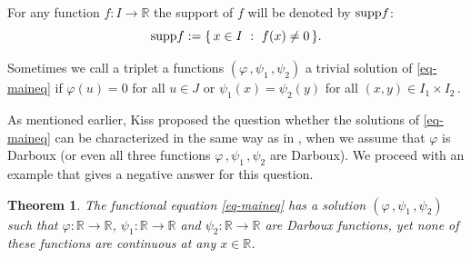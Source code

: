 \documentclass[12pt]{amsart}
\newtheorem{thm}{Theorem}
\theoremstyle{remark}
\theoremstyle{definition}
\newcommand{\RR}{\mathbb{R}}
\newcommand{\supp}{\mbox{\rm supp}}
\newcommand{\map}{\longrightarrow}
\begin{document}
For any function 
$ f : I \map \RR $ the support of $ f $ 
will be denoted by $ \supp f $: 
\[
\supp f := 
\lbrace \, x \in I \ : \ f(x) \neq 0 \, \rbrace. 
\]

%
%

Sometimes we call a triplet a functions 
$ (\varphi \,, \psi_1 \,, \psi_2) $ a 
trivial solution of \eqref{eq-maineq} if 
$ \varphi(u) = 0 $ for all $ u \in J $ or 
$ \psi_1(x) = \psi_2(y) $ for all 
$ (x,y) \in I_1 \times I_2 \, $. 

As mentioned earlier, Kiss proposed the question whether 
the solutions of \eqref{eq-maineq} can be characterized in the 
same way as in \cite[Theorem 6]{Kis24}, when we assume that 
$ \varphi $ is Darboux (or even all three functions 
$ \varphi \,, \psi_1 \,, \psi_2 $ are Darboux). 
We proceed with an example that gives a negative answer 
for this question. 

\begin{thm}\label{thm-darboux_example}
The functional equation \eqref{eq-maineq} has a solution 
$ \left( \varphi \,, \psi_1 \,, \psi_2 \right) $ such that 
$ \varphi : \RR \map \RR $, 
$ \psi_1 : \RR \map \RR $ and 
$ \psi_2 : \RR \map \RR $ are Darboux functions, 
yet none of these functions are continuous 
at any $ x \in \RR $. 
\end{thm}
\end{document}
